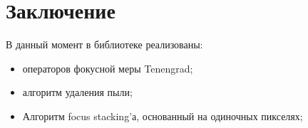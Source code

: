 \documentclass[14pt]{matmex-diploma-custom}
\begin{document}
\section*{Заключение}
В данный момент в библиотеке реализованы:
\begin{itemize}
    \item операторов фокусной меры Tenengrad;
    \item алгоритм удаления пыли;
    \item Алгоритм focus stacking'а, основанный на одиночных пикселях;
\end{itemize}

\setmonofont[Mapping=tex-text]{CMU Typewriter Text}


\end{document}
